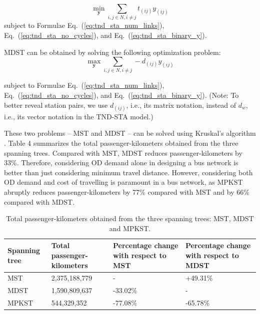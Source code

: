 \documentclass[10pt,english]{article}
\renewcommand{\eqref}[1]{Eq.~(\ref{#1})}
\begin{document}
\begin{equation}
  \min_{\boldsymbol{y}} \sum_{i,j \in N, i\neq j} t_{(ij)} y_{(ij)}
  \label{eq:minimum_distance_spanning_tree}
\end{equation}
subject to Formulae \eqref{eq:tnd_sta_num_links}, \eqref{eq:tnd_sta_no_cycles}, and \eqref{eq:tnd_sta_binary_y}.

MDST can be obtained by solving the following optimization problem:
\begin{equation}
  \max_{\boldsymbol{y}} \sum_{i,j \in N, i\neq j} -d_{(ij)} y_{(ij)}
  \label{eq:maximum_demand_spanning_tree}
\end{equation}

subject to Formulae \eqref{eq:tnd_sta_num_links}, \eqref{eq:tnd_sta_no_cycles}, and \eqref{eq:tnd_sta_binary_y}. (Note: To better reveal station pairs, we use $d_{\left(ij\right)}$, i.e., its matrix notation, instead of $d_w$, i.e., its vector notation in the TND-STA model.)

These two problems -- MST and MDST -- can be solved using Kruskal's algorithm \citep{Kruskal1956}. Table 4 summarizes the total passenger-kilometers obtained from the three spanning trees.  Compared with MST, MDST reduces passenger-kilometers by 33\%. 
Therefore, considering OD demand alone in designing a bus network is better than just considering minimum travel distance. 
However, considering both OD demand and cost of travelling is paramount in a bus network, as MPKST abruptly reduces passenger-kilometers by 77\% compared with MST and by 66\% compared with MDST.

\begin{table}[h]
\centering
\caption{Total passenger-kilometers obtained from the three spanning trees: MST, MDST and MPKST.}
\label{tab:res_spanning_trees}
\begin{tabular}{p{} p{} p{} p{}}
\hline
Spanning tree & Total passenger-kilometers & Percentage change with respect to MST & Percentage change with respect to MDST \\
\hline
MST & 2,375,188,779 & - & +49.31\% \\
MDST & 1,590,809,637 & -33.02\% & - \\
MPKST & 544,329,352 & -77.08\% & -65.78\% \\
\hline
\end{tabular}
\end{table}
\end{document}
